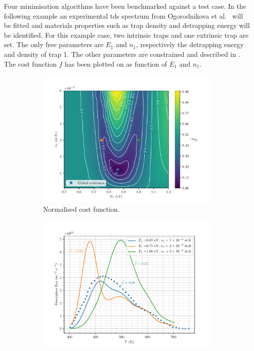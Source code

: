 Four minimisation algorithms have been benchmarked against a test case.
In the following example an experimental \gls{tds} spectrum from Ogorodnikova et al.\  will be fitted and materials properties such as trap density and detrapping energy will be identified.
For this example case, two intrinsic traps and one extrinsic trap are set.
The only free parameters are $E_1$ and $n_1$, respectively the detrapping energy and density of trap 1.
The other parameters are constrained and described in .
The cost function $f$ has been plotted on  as function of $E_1$ and $n_1$.

\begin{figure} [h!]
    \centering
        \begin{subfigure}[t]{0.7\linewidth}
            \centering
            \includegraphics[width=\linewidth]{Figures/Chapter3/Parametric_optimisation/cost_function_2D.pdf}
            \caption{Normalised cost function.}
        \end{subfigure}
        \begin{subfigure}[t]{0.7\linewidth}
            \centering
            \includegraphics[width=\linewidth]{Figures/Chapter3/Parametric_optimisation/points_on_cost_function.pdf}

\end{subfigure}
\end{figure}
